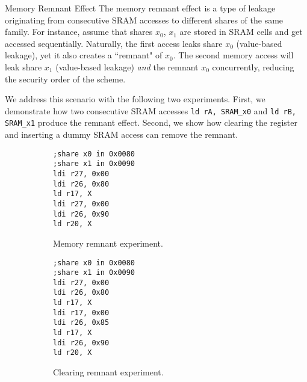 \begin{subsection}{Memory Remnant Effect}
\label{mem_remnant}
The memory remnant effect is a type of leakage originating from consecutive SRAM accesses to different shares of the same family. For instance, assume that shares $x_0$, $x_1$ are stored in SRAM cells and get accessed sequentially. Naturally, the first access leaks share $x_0$ (value-based leakage), yet it also creates a ``remnant" of $x_0$. The second memory access will leak share $x_1$ (value-based leakage) \emph{and} the remnant $x_0$ concurrently, reducing the security order of the scheme.

We address this scenario with the following two experiments. First, we demonstrate how two consecutive SRAM accesses \texttt{ld rA, SRAM\_x0} and \texttt{ld rB, SRAM\_x1} produce the remnant effect. Second, we show how clearing the register and inserting a dummy SRAM access can remove the remnant.    
\begin{figure}[H]
    \centering
\begin{subfigure}[b]{0.4\textwidth}
      \texttt{;share x0 in 0x0080 \\
;share x1 in 0x0090 \\
ldi r27, 0x00\\
ldi r26, 0x80\\
ld r17, X\\
ldi r27, 0x00\\
ldi r26, 0x90\\
ld r20, X
			}

        \caption{\scriptsize{Memory remnant experiment.}}

    \end{subfigure}
\begin{subfigure}[b]{0.4\textwidth}
          \texttt{;share x0 in 0x0080 \\
;share x1 in 0x0090 \\
ldi r27, 0x00\\
ldi r26, 0x80\\
ld r17, X\\
ldi r17, 0x00\\
ldi r26, 0x85\\
ld r17, X\\
ldi r26, 0x90\\
ld r20, X
			}

        \caption{\scriptsize{Clearing remnant experiment.}}

    \end{subfigure}


 \begin{subfigure}[b]{0.47\textwidth}


\end{subfigure}
\end{figure}
\end{subsection}
